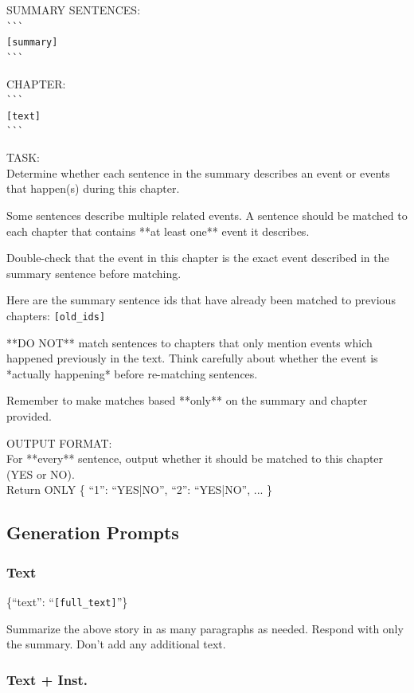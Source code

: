 \documentclass{article} %
\begin{document}
SUMMARY SENTENCES: \\
\verb|```|\\
\texttt{[summary]}\\
\verb|```|

CHAPTER: \\
\verb|```| \\
\texttt{[text]}\\
\verb|```|

TASK: \\
Determine whether each sentence in the summary describes an event or events that happen(s) during this chapter. 

Some sentences describe multiple related events. A sentence should be matched to each chapter that contains **at least one** event it describes.

Double-check that the event in this chapter is the exact event described in the summary sentence before matching.

Here are the summary sentence ids that have already been matched to previous chapters: \texttt{[old\_ids]}

**DO NOT** match sentences to chapters that only mention events which happened previously in the text. Think carefully about whether the event is *actually happening* before re-matching sentences. 

Remember to make matches based **only** on the summary and chapter provided.

OUTPUT FORMAT: \\
For **every** sentence, output whether it should be matched to this chapter (YES or NO). \\
Return ONLY \{ ``1'': ``YES|NO'', ``2'': ``YES|NO'', ... \}

\subsection{Generation Prompts}
\label{sec:generationPrompts}

\subsubsection{Text}

\{``text'': ``\texttt{[full\_text]}''\}

Summarize the above story in as many paragraphs as needed. Respond with only the summary. Don't add any additional text.

\subsubsection{Text + Inst.}
\end{document}
